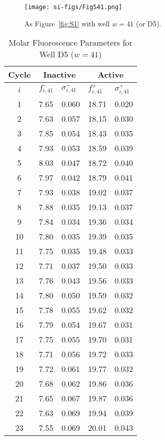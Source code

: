                 \begin{figure}
                    \centering
                    \texttt{[image: si-figs/FigS41.png]}
                    \caption{
                        As Figure~\ref{fig:S1} with well $w=41$ (or D5).
                    }
                \end{figure}
                \clearpage
    \begin{table}
        \caption{Molar Fluorescence Parameters for Well D5 ($w=41$)}
        \centering
        \begin{tabular}{c|ll|ll}
            Cycle & \multicolumn{2}{c|}{Inactive} & \multicolumn{2}{c}{Active} \\
            \hline
            $i$ & $f_{i,41}^{-}$ & $\sigma_{i,41}^{-}$ &  $f_{i,41}^{+}$ & $\sigma_{i,41}^{+}$ \\
            \hline
    1 & 7.65 & 0.060 & 18.71 & 0.020 \\
2 & 7.63 & 0.057 & 18.15 & 0.030 \\
3 & 7.85 & 0.054 & 18.43 & 0.035 \\
4 & 7.93 & 0.053 & 18.59 & 0.039 \\
5 & 8.03 & 0.047 & 18.72 & 0.040 \\
6 & 7.97 & 0.042 & 18.79 & 0.041 \\
7 & 7.93 & 0.038 & 19.02 & 0.037 \\
8 & 7.88 & 0.035 & 19.13 & 0.037 \\
9 & 7.84 & 0.034 & 19.36 & 0.034 \\
10 & 7.80 & 0.035 & 19.39 & 0.035 \\
11 & 7.75 & 0.035 & 19.48 & 0.033 \\
12 & 7.71 & 0.037 & 19.50 & 0.033 \\
13 & 7.76 & 0.043 & 19.56 & 0.033 \\
14 & 7.80 & 0.050 & 19.59 & 0.032 \\
15 & 7.78 & 0.055 & 19.62 & 0.032 \\
16 & 7.79 & 0.054 & 19.67 & 0.031 \\
17 & 7.75 & 0.055 & 19.70 & 0.031 \\
18 & 7.71 & 0.056 & 19.72 & 0.033 \\
19 & 7.72 & 0.061 & 19.77 & 0.032 \\
20 & 7.68 & 0.062 & 19.86 & 0.036 \\
21 & 7.65 & 0.067 & 19.87 & 0.036 \\
22 & 7.63 & 0.069 & 19.94 & 0.039 \\
23 & 7.55 & 0.069 & 20.01 & 0.043 \\

\end{tabular}
\end{table}
